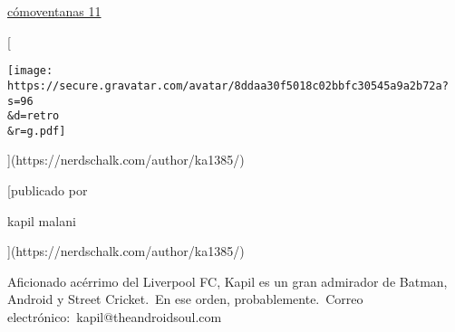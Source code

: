 \documentclass[
  letterpaper,
]{article}
\begin{document}
\href{https://nerdschalk.com/tag/how-to/}{cómo}\href{https://nerdschalk.com/tag/windows-11/}{ventanas
11}

{[}

\texttt{[image: https://secure.gravatar.com/avatar/8ddaa30f5018c02bbfc30545a9a2b72a?s=96\\\&d=retro\\\&r=g.pdf]}

{]}(https://nerdschalk.com/author/ka1385/)

{[}publicado por

kapil malani

{]}(https://nerdschalk.com/author/ka1385/)

Aficionado acérrimo del Liverpool FC, Kapil es un gran admirador de
Batman, Android y Street Cricket.~En ese orden, probablemente.~Correo
electrónico:~kapil@theandroidsoul.com


\printbibliography
\end{document}
